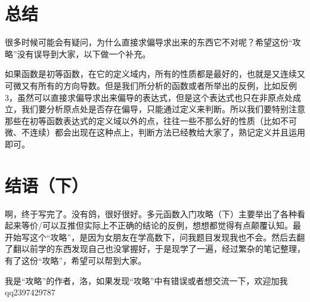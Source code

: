 \documentclass{article}
\begin{document}
\newpage

\section{总结}
很多时候可能会有疑问，为什么直接求偏导求出来的东西它不对呢？希望这份“攻略”没有误导到大家，以下做一个补充。

如果函数是初等函数，在它的定义域内，所有的性质都是最好的，也就是又连续又可微又有所有的方向导数。但是我们所分析的函数或者所举出的反例，比如反例3，虽然可以直接求偏导求出来偏导的表达式，但是这个表达式也只在非原点处成立，我们要分析原点处是否存在偏导，只能通过定义来判断。所以我们要特别注意那些在初等函数表达式的定义域以外的点，往往一些不那么好的性质（比如不可微、不连续）都会出现在这种点上，判断方法已经教给大家了，熟记定义并且运用即可。


\section{结语（下）}
啊，终于写完了。没有鸽，很好很好。多元函数入门攻略（下）主要举出了各种看起来等价/可以互推但实际上不正确的结论的反例，想想都觉得有点颠覆认知。最开始写这个“攻略”，是因为女朋友在学高数下，问我题目发现我也不会。然后去翻了翻以前学的东西发现自己也没掌握好，于是现学了一遍，经过繁杂的笔记整理，有了这份“攻略”，希望可以帮到大家。

我是“攻略”的作者，洛，如果发现“攻略”中有错误或者想交流一下，欢迎加我qq2397429787
\end{document}
